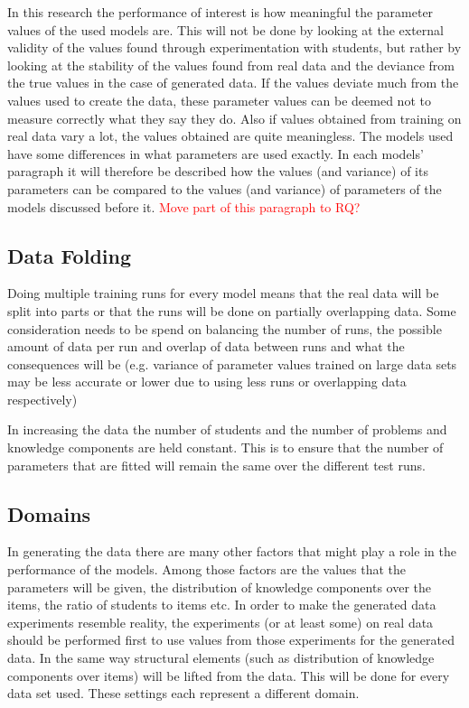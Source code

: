 \documentclass{article}
\newcommand\todo[1]{\textcolor{red}{#1}}
\begin{document}
In this research the performance of interest is how meaningful the parameter values of the used models are. This will not be done by looking at the external validity of the values found through experimentation with students, but rather by looking at the stability of the values found from real data and the deviance from the true values in the case of generated data. If the values deviate much from the values used to create the data, these parameter values can be deemed not to measure correctly what they say they do. Also if values obtained from training on real data vary a lot, the values obtained are quite meaningless. The models used have some differences in what parameters are used exactly. In each models' paragraph it will therefore be described how the values (and variance) of its parameters can be compared to the values (and variance) of parameters of the models discussed before it.
\todo{Move part of this paragraph to RQ?}


\subsection{Data Folding}
Doing multiple training runs for every model means that the real data will be split into parts or that the runs will be done on partially overlapping data. Some consideration needs to be spend on balancing the number of runs, the possible amount of data per run and overlap of data between runs and what the consequences will be (e.g. variance of parameter values trained on large data sets may be less accurate or lower due to using less runs or overlapping data respectively)

In increasing the data the number of students and the number of problems and knowledge components are held constant. This is to ensure that the number of parameters that are fitted will remain the same over the different test runs.

\subsection{Domains}
\label{sec:domain}
In generating the data there are many other factors that might play a role in the performance of the models. Among those factors are the values that the parameters will be given, the distribution of knowledge components over the items, the ratio of students to items etc. In order to make the generated data experiments resemble reality, the experiments (or at least some) on real data should be performed first to use values from those experiments for the generated data. In the same way structural elements (such as distribution of knowledge components over items) will be lifted from the data. This will be done for every data set used. These settings each represent a different domain.
\end{document}
